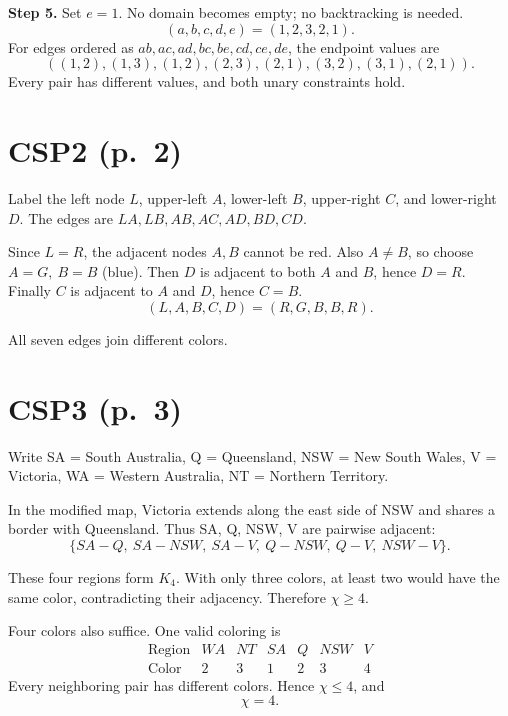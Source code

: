 \documentclass[11pt,a4paper]{article}
\begin{document}
\textbf{Step 5.} Set $e=1$. No domain becomes empty; no backtracking is needed.
\[
\boxed{(a,b,c,d,e)=(1,2,3,2,1)}.
\]
For edges ordered as $ab,ac,ad,bc,be,cd,ce,de$, the endpoint values are
\[
((1,2),(1,3),(1,2),(2,3),(2,1),(3,2),(3,1),(2,1)).
\]
Every pair has different values, and both unary constraints hold.

\newpage
\section*{CSP2 (p.\ 2)}
Label the left node $L$, upper-left $A$, lower-left $B$,
upper-right $C$, and lower-right $D$.
The edges are $LA,LB,AB,AC,AD,BD,CD$.

Since $L=R$, the adjacent nodes $A,B$ cannot be red.
Also $A\ne B$, so choose $A=G,\ B=B$ (blue).
Then $D$ is adjacent to both $A$ and $B$, hence $D=R$.
Finally $C$ is adjacent to $A$ and $D$, hence $C=B$.
\[
\boxed{(L,A,B,C,D)=(R,G,B,B,R)}.
\]
\begin{center}
\end{center}
All seven edges join different colors.

\section*{CSP3 (p.\ 3)}
Write SA = South Australia, Q = Queensland,
NSW = New South Wales, V = Victoria,
WA = Western Australia, NT = Northern Territory.

In the modified map, Victoria extends along the east side of NSW
and shares a border with Queensland. Thus SA, Q, NSW, V are
pairwise adjacent:
\[
\{SA\!-\!Q,\ SA\!-\!NSW,\ SA\!-\!V,\ Q\!-\!NSW,\ Q\!-\!V,\ NSW\!-\!V\}.
\]
\begin{center}
\end{center}
These four regions form $K_4$. With only three colors, at least two
would have the same color, contradicting their adjacency. Therefore
$\chi\ge4$.

Four colors also suffice. One valid coloring is
\[
\begin{array}{c|cccccc}
\text{Region}&WA&NT&SA&Q&NSW&V\\ \hline
\text{Color}&2&3&1&2&3&4
\end{array}
\]
Every neighboring pair has different colors. Hence $\chi\le4$, and
\[
\boxed{\chi=4}.
\]
\end{document}
